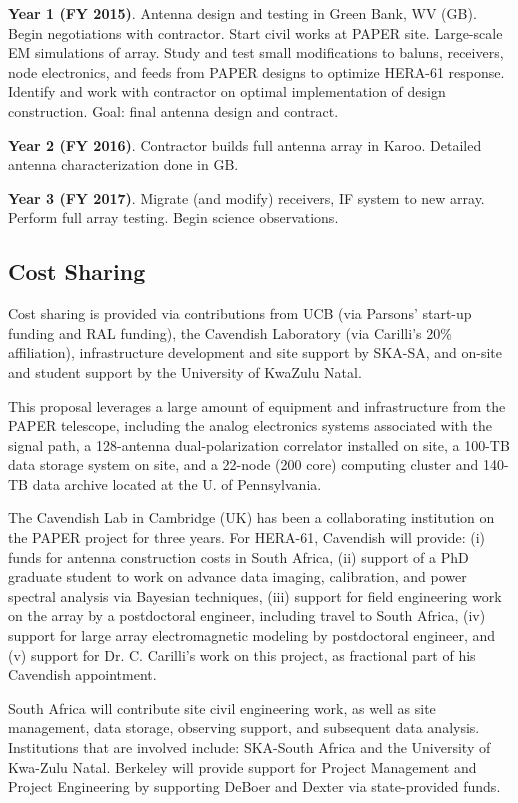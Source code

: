 \documentclass[preprint]{aastex}
\begin{document}
{\bf Year 1 (FY 2015)}.  Antenna design and testing in Green Bank, WV (GB). Begin
negotiations with contractor. Start civil works at PAPER
site. Large-scale EM simulations of array. Study and test small
modifications to baluns, receivers, node electronics, and feeds from
PAPER designs to optimize HERA-61 response. Identify and work with contractor on 
optimal implementation of design construction.  Goal: final antenna design and contract. 

{\bf Year 2 (FY 2016)}. Contractor builds full antenna array in
Karoo. Detailed antenna characterization done in GB. 

{\bf Year 3 (FY 2017)}.  Migrate (and modify) receivers, IF system to 
new array. Perform full array testing. Begin science observations. 

\vspace{-0.25in}
\subsection{Cost Sharing}
\vspace{-6pt}

Cost sharing is provided via contributions from UCB (via Parsons'
start-up funding and RAL funding), the Cavendish Laboratory (via Carilli's 20\%
affiliation),
infrastructure development and site support by SKA-SA, and on-site and student support
by the University of KwaZulu Natal.

This proposal leverages a large amount of equipment and infrastructure
from the PAPER telescope, including the analog electronics systems
associated with the signal path, a 128-antenna dual-polarization
correlator installed on site, a 100-TB data storage system on site,
and a 22-node (200 core) computing cluster and 140-TB data archive
located at the U. of Pennsylvania.

The Cavendish Lab in Cambridge (UK) has been a collaborating institution on
the PAPER project for three years. For HERA-61, Cavendish will provide: 
(i) funds for antenna construction costs in South Africa,
(ii) support of a PhD graduate student to work on advance data
imaging, calibration, and power spectral analysis via Bayesian techniques, 
(iii) support for field engineering work on the array by a postdoctoral engineer, including
travel to South Africa, (iv) support for large array electromagnetic
modeling by postdoctoral engineer, and (v) support for
Dr. C. Carilli's work on this project, as fractional part of his
Cavendish appointment.

South Africa will contribute site civil engineering work, as well as site 
management, data storage, observing support, and subsequent data analysis. 
Institutions that are involved include: SKA-South Africa and the University 
of Kwa-Zulu Natal.
Berkeley will provide support for Project Management and Project Engineering by
supporting DeBoer and Dexter via state-provided funds.
\end{document}
